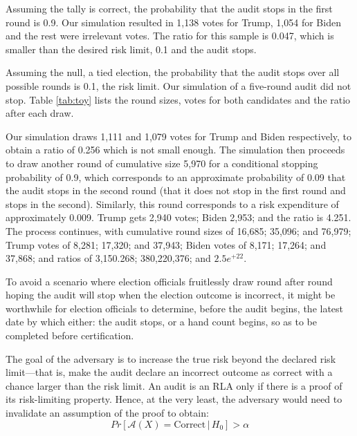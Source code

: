 Assuming the tally is correct, the probability that the audit stops in the first round is 0.9. Our simulation resulted in 1,138 votes for Trump, 1,054 for Biden and the rest were irrelevant votes. The \Providence ratio for this sample is 0.047, which is smaller than the desired risk limit, 0.1 and the audit stops. 

Assuming the null, a tied election, the probability that the audit stops over all possible rounds is 0.1, the risk limit. Our simulation of a five-round audit did not stop. 
Table \ref{tab:toy} lists the round sizes, votes for both candidates and the \Providence ratio after each draw. 

Our simulation draws 1,111 and 1,079 votes for Trump and Biden respectively, to obtain a \Providence ratio of 0.256 which is not small enough. The simulation then proceeds to draw another round of cumulative size 5,970 for a conditional stopping probability of 0.9, which corresponds to an approximate probability of 0.09 that the audit stops in the second round (that it does not stop in the first round and stops in the second). Similarly, this round corresponds to a risk expenditure of approximately 0.009. Trump gets 2,940 votes; Biden 2,953; and the ratio is 4.251. The process continues, with cumulative round sizes of 16,685; 35,096; and 76,979; Trump votes of 8,281; 17,320; and 37,943; Biden votes of 8,171; 17,264; and 37,868; and \Providence ratios of 3,150.268; 380,220,376; and $2.5e^{+22}$. 

To avoid a scenario where election officials fruitlessly draw round after round hoping the audit will stop when the election outcome is incorrect, it might be worthwhile for election officials to determine, before the audit begins, the latest date by which either: the audit stops, or a hand count begins, so as to be completed before certification. 

 The goal of the adversary is to increase the true risk beyond the declared risk limit---that is, make the audit declare an incorrect outcome as correct with a chance larger than the risk limit. An audit is an RLA only if there is a proof of its risk-limiting property. Hence, at the very least, the adversary would need to invalidate an assumption of the proof to obtain:  
$$
Pr[\mathcal{A}(X) 
= \text{Correct} \,|\, H_0] > \alpha
$$

